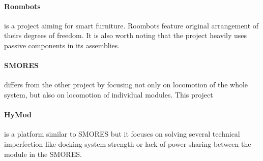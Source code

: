 \paragraph{Roombots} \cite{bonardi_locomotion_2012} is a project aiming for
smart furniture. Roombots feature original arrangement of theirs degrees of
freedom. It is also worth noting that the project heavily uses passive
components in its assemblies.

\paragraph{SMORES} \cite{davey_emulating_2012} differs from the other project by
focusing not only on locomotion of the whole system, but also on locomotion of
individual modules. This project

\paragraph{HyMod} \cite{gros_hymod:_2018} is a platform similar to SMORES but it
focuses on solving several technical imperfection like docking system strength
or lack of power sharing between the module in the SMORES.
